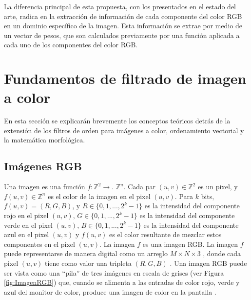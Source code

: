 La diferencia principal de esta propuesta, con los presentados en el estado del arte, radica en la extracci\'on de informaci\'on de cada componente del color RGB en un dominio espec\'ifico de la imagen. Esta informaci\'on se extrae por medio de un vector de pesos, que son calculados previamente por una funci\'on aplicada a cada uno de los componentes del color RGB. 



\section{Fundamentos de filtrado de imagen a color}
\label{Teo}

En esta secci\'on se explicar\'an brevemente los conceptos te\'oricos detr\'as de la extensi\'on de los filtros de orden para im\'agenes a color, ordenamiento vectorial y la matem\'atica morfol\'ogica. 

\subsection{Im\'agenes RGB}

Una imagen es una funci\'on $f:\mathbb{Z}^2 \rightarrow$.  
$\mathbb{Z}^n$.  Cada par $(u,v) \in \mathbb{Z}^2$ es un pixel, y $f(u,v) \in \mathbb Z^n $ es el color de la imagen en el pixel $(u,v)$. Para $k$ bits, $f(u,v) = (R,G,B)$, y $R \in \{0,1,...,2^k-1\}$ es la intensidad del componente rojo en el pixel $(u,v)$, $G \in \{0,1,...,2^k-1\}$ es la intensidad del componente verde en el pixel $(u,v)$, $B \in \{0,1,...,2^k-1\}$ es la intensidad del componente azul en el pixel $(u,v)$  y $f(u,v)$ es el color resultante de mezclar estos componentes en el pixel $(u,v)$. La imagen $f$ es una imagen RGB. %
La imagen $f$ puede representarse de manera digital como un arreglo $M \times N \times 3$ , donde cada pixel $(u,v)$ tiene como valor una tripleta $(R,G,B)$ \cite{gonzales2004digital}. Una imagen RGB puede ser vista como una ``pila'' de tres im\'agenes en escala de grises (ver Figura \ref{fig:ImagenRGB}) que, cuando se alimenta a las entradas de color rojo, verde y azul del monitor de color, produce una imagen de color en la pantalla \cite{gonzales2004digital}.


